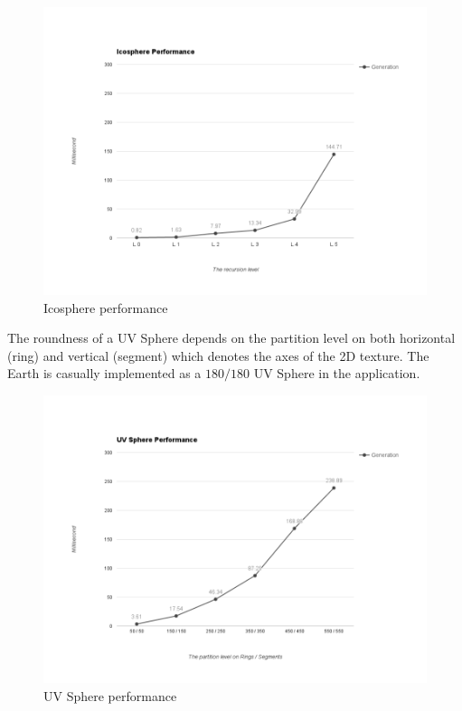 \begin{figure}[H]
	\caption{Icosphere performance}
	\label{fig:icosphere-performance}
	\centering
	\includegraphics[width=\textwidth, keepaspectratio]{Figures/icosphere-performance.png}
	\decoRule
\end{figure}

The roundness of a UV Sphere depends on the partition level on both horizontal (ring) and vertical (segment) which denotes the axes of the 2D texture. The Earth is casually implemented as a $180 / 180$ UV Sphere in the application.

\begin{figure}[H]
	\caption{UV Sphere performance}
	\label{fig:uv-sphere-performance}
	\centering
	\includegraphics[width=\textwidth, keepaspectratio]{Figures/uv-sphere-performance.png}
	\decoRule
\end{figure}

